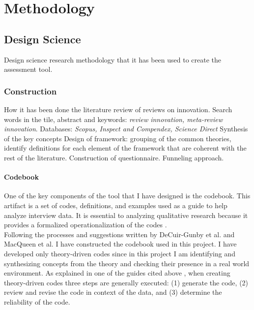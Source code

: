 
\chapter{Methodology} %

\label{Chapter3} %



\section{Design Science}
Design science research methodology that it has been used to create the assessment tool.

\subsection{Construction}
\label{subsec:Construction}
How it has been done the literature review of reviews on innovation. Search words in the tile, abstract and keywords: \textit{review innovation, meta-review innovation}. Databases: \textit{Scopus, Inspect and Compendex, Science Direct}
Synthesis of the key concepts
Design of framework: grouping of the common theories, identify definitions for each element of the framework that are coherent with the rest of the literature.
Construction of questionnaire. Funneling approach.
\subsubsection{Codebook}
One of the key components of the tool that I have designed is the codebook. This artifact is a set of codes, definitions, and examples used as a guide to help analyze interview data. It is essential to analyzing qualitative research because it provides a formalized operationalization of the codes \citep{CodebookGuide}. \\
Following the processes and suggestions written by DeCuir-Gunby et al. \citep{CodebookGuide} and MacQueen et al. \citep{CodebookGuide2} I have constructed the codebook used in this project.
I have developed only theory-driven codes since in this project I am identifying and synthesizing concepts from the theory and checking their presence in a real world environment. As explained in one of the guides cited above \citep{CodebookGuide}, when creating theory-driven codes three steps are generally executed: (1) generate the code, (2) review and revise the code in context of the data, and (3) determine the reliability of the code. \\

